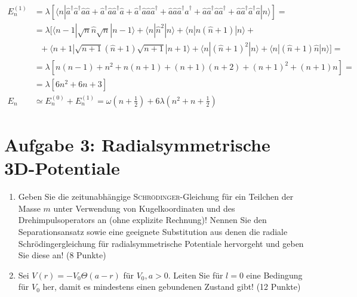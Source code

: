 \documentclass[a4paper,12pt]{article}
\newcommand{\braket}{}
\newcommand{\kla}{}
\newcommand{\klam}{}
\begin{document}
\begin{enumerate}
\begin{align*}
E_n^{(1)}&=\lambda\klam\left[ \braket\langle {n} | {\hat{a}^\dagger\hat{a}^\dagger\hat{a}\hat{a}+\hat{a}^\dagger\hat{a}\hat{a}^\dagger\hat{a}+\hat{a}^\dagger\hat{a}\hat{a}\hat{a}^\dagger+\hat{a}\hat{a}\hat{a}^\dagger\hat{a}^\dagger+\hat{a}\hat{a}^\dagger\hat{a}\hat{a}^\dagger+\hat{a}\hat{a}^\dagger\hat{a}^\dagger\hat{a}} | {n}\rangle \right]=\\
&=\lambda\klam\big[ \braket\langle {n-1} | {\sqrt{n}\hat{n}\sqrt{n}} | {n-1}\rangle+\braket\langle {n} | {\hat{n}^2} | {n}\rangle+\braket\langle {n} | {\hat{n}(\hat{n}+1)} | {n}\rangle+\\
&\ \ \ +\braket\langle {n+1} | {\sqrt{n+1}(\hat{n}+1)\sqrt{n+1}} | {n+1}\rangle+\braket\langle {n} | {(\hat{n}+1)^2} | {n}\rangle+\braket\langle {n} | {(\hat{n}+1)\hat{n}} | {n}\rangle \big]=\\
&=\lambda\klam\left[ {n(n-1)+n^2+n(n+1)+(n+1)(n+2)+(n+1)^2+(n+1)n} \right]=\\
&=\lambda\klam\left[ {6n^2+6n+3} \right]\\
E_n&\simeq E_n^{(0)}+E_n^{(1)}=\omega\kla\left( {n+\frac{1}{2}} \right)+6\lambda\kla\left( {n^2+n+\frac{1}{2}} \right)
\end{align*}
\end{enumerate}
\section*{Aufgabe 3: Radialsymmetrische 3D-Potentiale}
\begin{enumerate}
\item[a)] Geben Sie die zeitunabhängige \textsc{Schrödinger}-Gleichung für ein Teilchen der Masse $m$ unter Verwendung von Kugelkoordinaten und des Drehimpulsoperators an (ohne explizite Rechnung)! Nennen Sie den Separationsansatz sowie eine geeignete Substitution aus denen die radiale Schrödingergleichung für radialsymmetrische Potentiale hervorgeht und geben Sie diese an! (8 Punkte)
\item[b)] Sei $V(r)=-V_0\Theta(a-r)$ für $V_0,a>0$. Leiten Sie für $l=0$ eine Bedingung für $V_0$ her, damit es mindestens einen gebundenen Zustand gibt! (12 Punkte)
\end{enumerate}
\end{document}
